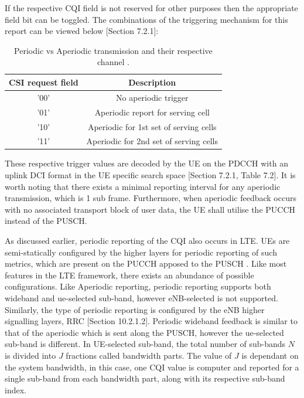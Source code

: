\documentclass{article}
\begin{document}
If the respective CQI field is not reserved for other purposes then the appropriate field bit can be toggled. The combinations of the triggering mechanism for this report can be viewed below \cite{ETSITS136213}[Section 7.2.1]: 

\begin{table}[H]
    \centering
     \begin{tabular}{||c c||} 
     \hline
      CSI request field & Description \\ [0.1ex] 
     \hline\hline
     '00' & No aperiodic trigger  \\ 
     \hline
     '01'  & Aperiodic report for serving cell\\
     \hline
     '10' & Aperiodic for 1st set of serving cells\\ 
     \hline
     '11'  & Aperiodic for 2nd set of serving cells\\
     \hline
    \end{tabular}
    \caption{Periodic vs Aperiodic transmission and their respective channel .}
    \label{tab:cqi_aperiod}
\end{table}
These respective trigger values are decoded by the UE on the PDCCH with an uplink DCI format in the UE specific search space \cite{ETSITS136213}[Section 7.2.1, Table 7.2].
It is worth noting that there exists a minimal reporting interval for any aperiodic transmission, which is 1 sub frame. Furthermore, when aperiodic feedback occurs with no associated transport block of user data, the UE shall utilise the PUCCH instead of the PUSCH.

As discussed earlier, periodic reporting of the CQI also occurs in LTE. UEs are semi-statically configured by the higher layers for periodic reporting of such metrics, which are present on the PUCCH apposed to the PUSCH \cite[Section 7.2.2]{ETSITS136213}. Like most features in the LTE framework, there exists an abundance of possible configurations. Like Aperiodic reporting, periodic reporting supports both wideband and ue-selected sub-band, however eNB-selected is not supported. Similarly, the type of periodic reporting is configured by the eNB higher signalling layers, RRC \cite{umts_sesia}[Section 10.2.1.2]. Periodic wideband feedback is similar to that of the aperiodic which is sent along the PUSCH, however the ue-selected sub-band is different. In UE-selected sub-band, the total number of sub-bands $N$ is divided into $J$ fractions called bandwidth parts. The value of $J$ is dependant on the system bandwidth, in this case, one CQI value is computer and reported for a single sub-band from each bandwidth part, along with its respective sub-band index.
\end{document}
